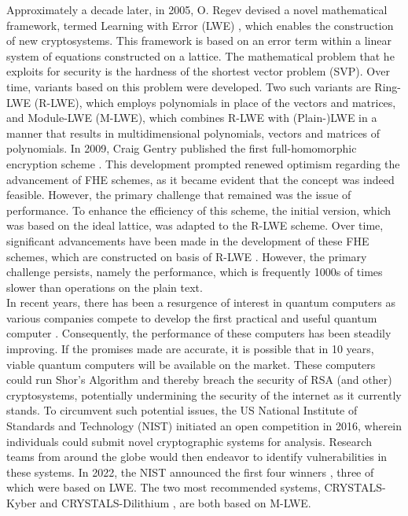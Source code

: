 Approximately a decade later, in 2005, O. Regev devised a novel mathematical framework, termed Learning with Error (LWE) \cite{Regev2005OnLL}, which enables the construction of new cryptosystems. This framework is based on an error term within a linear system of equations constructed on a lattice. The mathematical problem that he exploits for security is the hardness of the shortest vector problem (SVP). Over time, variants based on this problem were developed. Two such variants are Ring-LWE (R-LWE), which employs polynomials in place of the vectors and matrices, and Module-LWE (M-LWE), which combines R-LWE with (Plain-)LWE in a manner that results in multidimensional polynomials, vectors and matrices of polynomials. In 2009, Craig Gentry published the first full-homomorphic encryption scheme \cite{Gentry2009AFH}. This development prompted renewed optimism regarding the advancement of FHE schemes, as it became evident that the concept was indeed feasible. However, the primary challenge that remained was the issue of performance. To enhance the efficiency of this scheme, the initial version, which was based on the ideal lattice, was adapted to the R-LWE scheme. Over time, significant advancements have been made in the development of these FHE schemes, which are constructed on basis of R-LWE \cite{FHESurvey}. However, the primary challenge persists, namely the performance, which is frequently 1000s of times slower than operations on the plain text.\\
In recent years, there has been a resurgence of interest in quantum computers as various companies compete to develop the first practical and useful quantum computer \cite{googleQuantumComputing} \cite{ibmQuantumComputing}. Consequently, the performance of these computers has been steadily improving. If the promises made are accurate, it is possible that in 10 years, viable quantum computers will be available on the market. These computers could run Shor's Algorithm and thereby breach the security of RSA (and other) cryptosystems, potentially undermining the security of the internet as it currently stands. To circumvent such potential issues, the US National Institute of Standards and Technology (NIST) initiated an open competition in 2016, wherein individuals could submit novel cryptographic systems for analysis. Research teams from around the globe would then endeavor to identify vulnerabilities in these systems. In 2022, the NIST announced the first four winners \cite{nistAnouncement}, three of which were based on LWE. The two most recommended systems, CRYSTALS-Kyber \cite{CyrstalsKyber} and CRYSTALS-Dilithium \cite{crystalsDilithium}, are both based on M-LWE.


